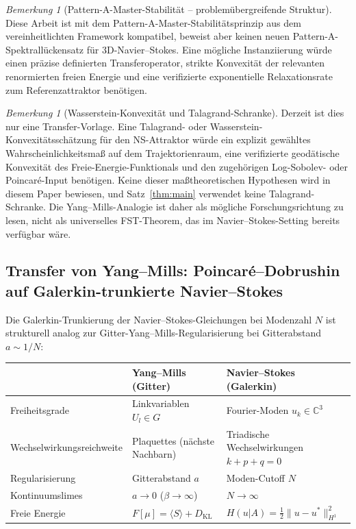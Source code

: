 \documentclass[12pt,a4paper]{article}
\theoremstyle{definition}
\theoremstyle{plain}
\theoremstyle{remark}
\newtheorem{remark}[definition]{Bemerkung}
\begin{document}
\begin{remark}[Pattern-A-Master-Stabilität -- problemübergreifende Struktur]
Diese Arbeit ist mit dem Pattern-A-Master-Stabilitätsprinzip aus dem vereinheitlichten Framework \cite{FST-Unified2026} kompatibel, beweist aber keinen neuen Pattern-A-Spektrallückensatz für 3D-Navier--Stokes. Eine mögliche Instanziierung würde einen präzise definierten Transferoperator, strikte Konvexität der relevanten renormierten freien Energie und eine verifizierte exponentielle Relaxationsrate zum Referenzattraktor benötigen.
\end{remark}

\begin{remark}[Wasserstein-Konvexität und Talagrand-Schranke]
\label{rem:talagrand}
Derzeit ist dies nur eine Transfer-Vorlage. Eine Talagrand- oder Wasserstein-Konvexitätsschätzung für den NS-Attraktor würde ein explizit gewähltes Wahrscheinlichkeitsmaß auf dem Trajektorienraum, eine verifizierte geodätische Konvexität des Freie-Energie-Funktionals und den zugehörigen Log-Sobolev- oder Poincaré-Input benötigen. Keine dieser maßtheoretischen Hypothesen wird in diesem Paper bewiesen, und Satz~\ref{thm:main} verwendet keine Talagrand-Schranke. Die Yang--Mills-Analogie ist daher als mögliche Forschungsrichtung zu lesen, nicht als universelles FST-Theorem, das im Navier--Stokes-Setting bereits verfügbar wäre.
\end{remark}

\subsection{\texorpdfstring{Transfer von Yang--Mills: Poincar\'e--Dobrushin auf Galerkin-trunkierte Navier--Stokes}{Transfer von Yang-Mills: Poincare-Dobrushin auf Galerkin-trunkierte Navier-Stokes}}
\label{sec:ym-ns-transfer}

Die Galerkin-Trunkierung der Navier--Stokes-Gleichungen bei Modenzahl $N$ ist strukturell analog zur Gitter-Yang--Mills-Regularisierung bei Gitterabstand $a \sim 1/N$:

\begin{center}
\begin{tabularx}{\textwidth}{Y|Y|Y}
& \textbf{Yang--Mills (Gitter)} & \textbf{Navier--Stokes (Galerkin)} \\
\hline
Freiheitsgrade & Linkvariablen $U_l \in G$ & Fourier-Moden $\hat{u}_k \in \mathbb{C}^3$ \\
Wechselwirkungsreichweite & Plaquettes (nächste Nachbarn) & Triadische Wechselwirkungen $k + p + q = 0$ \\
Regularisierung & Gitterabstand $a$ & Moden-Cutoff $N$ \\
Kontinuumslimes & $a \to 0$ ($\beta \to \infty$) & $N \to \infty$ \\
Freie Energie & $F[\mu] = \langle S \rangle + D_{\mathrm{KL}}$ & $H(u|A) = \frac{1}{2}\|u - u^*\|_{H^1}^2$ \\
\end{tabularx}
\end{center}
\end{document}
